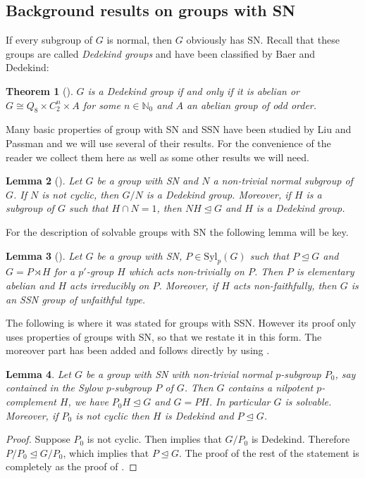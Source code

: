 \documentclass[a4paper,10pt]{amsart}
\newtheorem{lemma}{Lemma}[section]
\newtheorem{theorem}[lemma]{Theorem}
\theoremstyle{definition}
\theoremstyle{remark}
\begin{document}
\subsection{Background results on groups with SN}

If every subgroup of $G$ is normal, then $G$ obviously has SN. Recall that these groups are called {\it Dedekind groups} and have been classified by Baer and Dedekind:

\begin{theorem}[{\cite[Theorem 1.8.5.]{PolMilSehgalBook}}]\label{th:DedekindGroups}
$G$ is a Dedekind group if and only if it is abelian or $G \cong Q_8 \times C_2^n \times A$ for some $n \in \mathbb{N}_0$ and $A$ an abelian group of odd order.
\end{theorem}

Many basic properties of group with SN and SSN have been studied by Liu and Passman and we will use several of their results. For the convenience of the reader we collect them here as well as some other results we will need. 

\begin{lemma}[{\cite[Lemma 2.1]{LiuPassman16}\label{lem:LiuPassma2.1}}]
Let $G$ be a group with SN and $N$ a non-trivial normal subgroup of $G$. If $N$ is not cyclic, then $G/N$ is a Dedekind group. Moreover, if $H$ is a subgroup of $G$ such that $H \cap N = 1$, then $NH \unlhd G$ and $H$ is a Dedekind group. 
\end{lemma}

For the description of solvable groups with SN the following lemma will be key.

\begin{lemma}[{\cite[Lemma 2.4]{LiuPassman16}}]\label{lem:LP2.4}
Let $G$ be a group with SN, $P \in \text{Syl}_p(G)$ such that $P \unlhd G$ and $G = P \rtimes H$ for a $p'$-group $H$ which acts non-trivially on $P$. Then $P$ is elementary abelian and $H$ acts irreducibly on $P$. Moreover, if $H$ acts non-faithfully, then $G$ is an SSN group of unfaithful type.
\end{lemma}

The following is \cite[Lemma 2.5. (1)]{LiuPassman16} where it was stated for groups with SSN. However its proof only uses properties of groups with SN, so that we restate it in this form. The moreover part has been added and follows directly by using .

\begin{lemma}\label{lem:LP2.5}
Let $G$ be a group with SN with non-trivial normal $p$-subgroup $P_0$, say contained in the Sylow $p$-subgroup $P$ of $G$. Then $G$ contains a nilpotent $p$-complement $H$, we have $P_0 H \unlhd G$ and $G = PH$. In particular $G$ is solvable. Moreover, if $P_0$ is not cyclic then $H$ is Dedekind and $P \unlhd G$.
\end{lemma}
\begin{proof}
Suppose $P_0$ is not cyclic. Then  implies that $G/P_0$ is Dedekind. Therefore  $P/P_0 \unlhd G/P_0$, which implies that $P \unlhd G$. The proof of the rest of the statement is completely as the proof of \cite[Lemma 2.5. (1)]{LiuPassman16}.
\end{proof}
\end{document}
